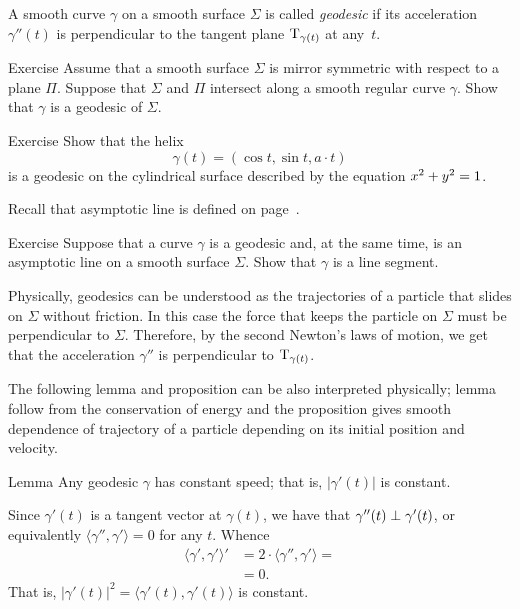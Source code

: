 A smooth curve $\gamma$ on a smooth surface $\Sigma$ is called \emph{geodesic} if its acceleration $\gamma''(t)$ is perpendicular to the tangent plane $\mathrm{T}_{\gamma(t)}$ at any~$t$.

\begin{thm}{Exercise}\label{ex:reflection-geodesic}
Assume that a smooth surface $\Sigma$ is mirror symmetric with respect to  a plane $\Pi$.
Suppose that $\Sigma$ and $\Pi$ intersect along a smooth regular curve $\gamma$.
Show that $\gamma$ is a geodesic of $\Sigma$.
\end{thm}

\begin{thm}{Exercise}\label{ex:helix=geodesic}
Show that the helix 
\[\gamma(t)=(\cos t,\sin t, a\cdot t)\]
is a geodesic on the cylindrical surface described by the equation $x^2\z+y^2=1$.
\end{thm}

Recall that asymptotic line is defined on page~\pageref{page:asymptotic line}.

\begin{thm}{Exercise}\label{ex:asymptotic-geodesic}
Suppose that a curve $\gamma$ is a geodesic and, at the same time, is an asymptotic line on a smooth surface $\Sigma$.
Show that $\gamma$ is a line segment.
\end{thm}

Physically, geodesics can be understood as the trajectories of a particle that slides on $\Sigma$ without friction.
In this case the force that keeps the particle on $\Sigma$ must be perpendicular to $\Sigma$.
Therefore, by the second Newton's laws of motion,
we get that the acceleration $\gamma''$ is perpendicular to $\mathrm{T}_{\gamma(t)}$.

The following lemma and proposition can be also interpreted physically;
lemma follow from the conservation of energy and the proposition gives smooth dependence of trajectory of a particle depending on its initial position and velocity.

\begin{thm}{Lemma}\label{lem:constant-speed}
Any geodesic $\gamma$ has constant speed; that is, $|\gamma'(t)|$ is constant.
\end{thm}

Since $\gamma'(t)$ is a tangent vector at $\gamma(t)$,
we have that $\gamma''(t)\z\perp\gamma'(t)$, or equivalently $\langle\gamma'',\gamma'\rangle=0$ for any $t$.
Whence 
\begin{align*}
\langle\gamma',\gamma'\rangle'&=2\cdot \langle\gamma'',\gamma'\rangle=
\\
&=0.
\end{align*}
That is, $|\gamma'(t)|^2=\langle\gamma'(t),\gamma'(t)\rangle$ is constant.
\qeds

